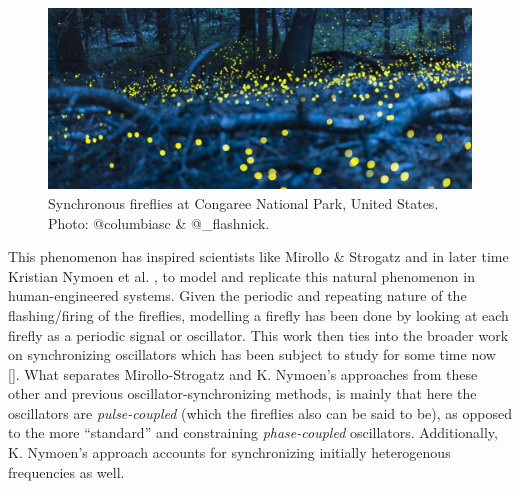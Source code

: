 \begin{figure}[!ht]
	\centering
	\includegraphics[width=0.9\linewidth]{Assets/DocSegments/Chapters/Background/Figures/Photos/synchronized_fireflies_phenomenon.jpg}
	\caption[Picture of fireflies flashing synchronously in a US National Park]{Synchronous fireflies at Congaree National Park, United States. Photo\protect\footnotemark: @columbiasc \& @\_flashnick.} %
	\label{fig:synched_fireflies_phenomenon}
\end{figure}


This phenomenon has inspired scientists like Mirollo \& Strogatz \cite{mirollo_strogatz_PCO_synch} and in later time Kristian Nymoen et al. \cite{nymoen_synch}, to model and replicate this natural phenomenon in human-engineered systems. Given the periodic and repeating nature of the flashing/firing of the fireflies, modelling a firefly has been done by looking at each firefly as a periodic signal or oscillator. This work \cite{mirollo_strogatz_PCO_synch, nymoen_synch} then ties into the broader work on synchronizing oscillators which has been subject to study for some time now []. What separates Mirollo-Strogatz and K. Nymoen's approaches from these other and previous oscillator-synchronizing methods, is mainly that here the oscillators are \textit{pulse-coupled} (which the fireflies also can be said to be), as opposed to the more ``standard'' and constraining \textit{phase-coupled} oscillators. Additionally, K. Nymoen's approach accounts for synchronizing initially heterogenous frequencies as well.




